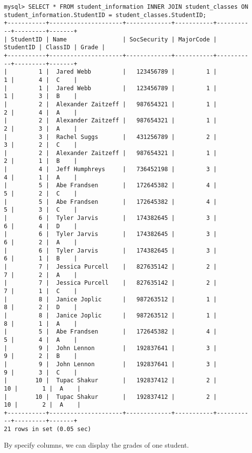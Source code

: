 {\begin{lstlisting}
mysql> SELECT * FROM student_information INNER JOIN student_classes ON student_information.StudentID = student_classes.StudentID;
+-----------+---------------------+-------------+-----------+-----------+---------+-------+
| StudentID | Name                | SocSecurity | MajorCode | StudentID | ClassID | Grade |
+-----------+---------------------+-------------+-----------+-----------+---------+-------+
|         1 |  Jared Webb         |   123456789 |         1 |         1 |       4 |  C    |
|         1 |  Jared Webb         |   123456789 |         1 |         1 |       3 |  B    |
|         2 |  Alexander Zaitzeff |   987654321 |         1 |         2 |       4 |  A    |
|         2 |  Alexander Zaitzeff |   987654321 |         1 |         2 |       3 |  A    |
|         3 |  Rachel Suggs       |   431256789 |         2 |         3 |       2 |  C    |
|         2 |  Alexander Zaitzeff |   987654321 |         1 |         2 |       1 |  B    |
|         4 |  Jeff Humphreys     |   736452198 |         3 |         4 |       1 |  A    |
|         5 |  Abe Frandsen       |   172645382 |         4 |         5 |       2 |  C    |
|         5 |  Abe Frandsen       |   172645382 |         4 |         5 |       3 |  C    |
|         6 |  Tyler Jarvis       |   174382645 |         3 |         6 |       4 |  D    |
|         6 |  Tyler Jarvis       |   174382645 |         3 |         6 |       2 |  A    |
|         6 |  Tyler Jarvis       |   174382645 |         3 |         6 |       1 |  B    |
|         7 |  Jessica Purcell    |   827635142 |         2 |         7 |       2 |  A    |
|         7 |  Jessica Purcell    |   827635142 |         2 |         7 |       1 |  C    |
|         8 |  Janice Joplic      |   987263512 |         1 |         8 |       2 |  D    |
|         8 |  Janice Joplic      |   987263512 |         1 |         8 |       1 |  A    |
|         5 |  Abe Frandsen       |   172645382 |         4 |         5 |       4 |  A    |
|         9 |  John Lennon        |   192837641 |         3 |         9 |       2 |  B    |
|         9 |  John Lennon        |   192837641 |         3 |         9 |       3 |  C    |
|        10 |  Tupac Shakur       |   192837412 |         2 |        10 |       1 |  A    |
|        10 |  Tupac Shakur       |   192837412 |         2 |        10 |       2 |  A    |
+-----------+---------------------+-------------+-----------+-----------+---------+-------+
21 rows in set (0.05 sec)

\end{lstlisting}

By specify columns, we can display the grades of one student.

}
